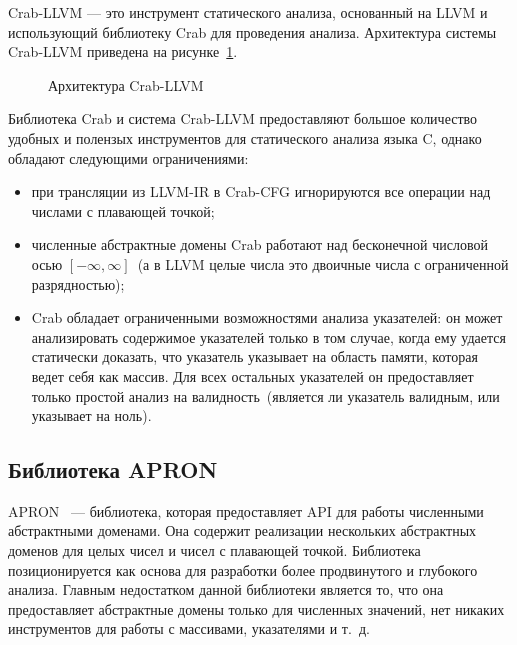 Crab-LLVM --- это инструмент статического анализа, основанный на LLVM и 
использующий библиотеку Crab для проведения анализа. Архитектура системы 
Crab-LLVM приведена на рисунке~\ref{image:crabArchitecture}.
\begin{figure}[h!]
\caption{Архитектура Crab-LLVM}
\label{image:crabArchitecture}
\end{figure}

Библиотека Crab и система Crab-LLVM предоставляют большое количество удобных
и полензых инструментов для статического анализа языка C, однако обладают 
следующими ограничениями:
\begin{itemize}
\item при трансляции из LLVM-IR в Crab-CFG игнорируются все операции над 
числами с плавающей точкой;
\item численные абстрактные домены Crab работают над бесконечной числовой 
осью $[-\infty, \infty]$~(а в LLVM целые числа это двоичные числа с 
ограниченной разрядностью);
\item Crab обладает ограниченными возможностями анализа указателей: он может
анализировать содержимое указателей только в том случае, когда ему удается 
статически доказать, что указатель указывает на область памяти, которая ведет 
себя как массив. Для всех остальных указателей он предоставляет только простой
анализ на валидность~(является ли указатель валидным, или указывает на ноль).
\end{itemize}

\subsection{Библиотека APRON}
APRON~\cite{apron} --- библиотека, которая предоставляет API для работы 
численными абстрактными доменами. Она содержит реализации нескольких
абстрактных доменов для целых чисел и чисел с плавающей точкой. Библиотека 
позиционируется как основа для разработки более продвинутого и глубокого 
анализа. Главным недостатком данной библиотеки является то, что она предоставляет абстрактные домены только для численных значений, нет никаких 
инструментов для работы с массивами, указателями и т.~д.


